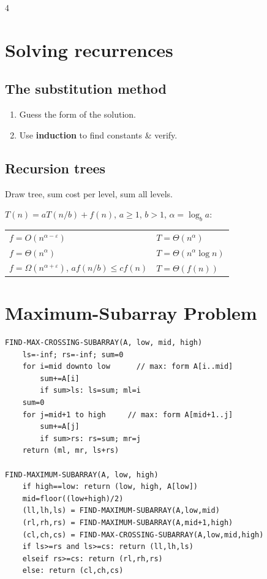 \documentclass[8pt,a4paper,landscape]{extarticle}
\begin{document}
\begin{multicols*}{4}
\section{Solving recurrences}

\subsection{The substitution method}
\begin{enumerate}
  \item Guess the form of the solution.
  \item Use \textbf{induction} to find constants \& verify.
\end{enumerate}

\subsection{Recursion trees}
Draw tree, sum cost per level, sum all levels.

\begin{thm}[title=Master Theorem]
$T(n)=aT(n/b)+f(n)$, $a\ge1$, $b>1$, $\alpha=\log_b a$:\\[2pt]
\begin{tabular}{@{}l@{$\;\Rightarrow\;$}l@{}}
$f=O(n^{\alpha-\varepsilon})$                        & $T=\Theta(n^\alpha)$ \\
$f=\Theta(n^{\alpha})$                               & $T=\Theta(n^\alpha\log n)$ \\
$f=\Omega(n^{\alpha+\varepsilon})$, $af(n/b)\le cf(n)$ & $T=\Theta(f(n))$ \\
\end{tabular}
\end{thm}

\section{Maximum-Subarray Problem}

\begin{lstlisting}
FIND-MAX-CROSSING-SUBARRAY(A, low, mid, high)
    ls=-inf; rs=-inf; sum=0
    for i=mid downto low      // max: form A[i..mid]
        sum+=A[i]
        if sum>ls: ls=sum; ml=i
    sum=0
    for j=mid+1 to high     // max: form A[mid+1..j]
        sum+=A[j]
        if sum>rs: rs=sum; mr=j
    return (ml, mr, ls+rs)

FIND-MAXIMUM-SUBARRAY(A, low, high)
    if high==low: return (low, high, A[low])
    mid=floor((low+high)/2)
    (ll,lh,ls) = FIND-MAXIMUM-SUBARRAY(A,low,mid)
    (rl,rh,rs) = FIND-MAXIMUM-SUBARRAY(A,mid+1,high)
    (cl,ch,cs) = FIND-MAX-CROSSING-SUBARRAY(A,low,mid,high)
    if ls>=rs and ls>=cs: return (ll,lh,ls)
    elseif rs>=cs: return (rl,rh,rs)
    else: return (cl,ch,cs)
\end{lstlisting}


\end{multicols*}
\end{document}
